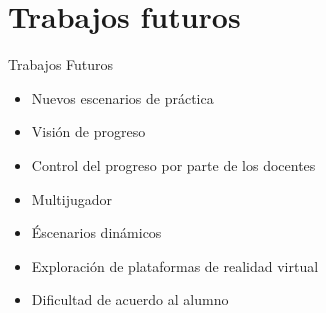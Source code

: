 \section{Trabajos futuros}
\setcounter{sectiontotal}{1}

\begin{frame}{Trabajos Futuros}
    \begin{itemize}[<+->]
        \item Nuevos escenarios de práctica
        \item Visión de progreso
        \item Control del progreso por parte de los docentes
        \item Multijugador
        \item Éscenarios dinámicos
        \item Exploración de plataformas de realidad virtual
        \item Dificultad de acuerdo al alumno
    \end{itemize}
\end{frame}

